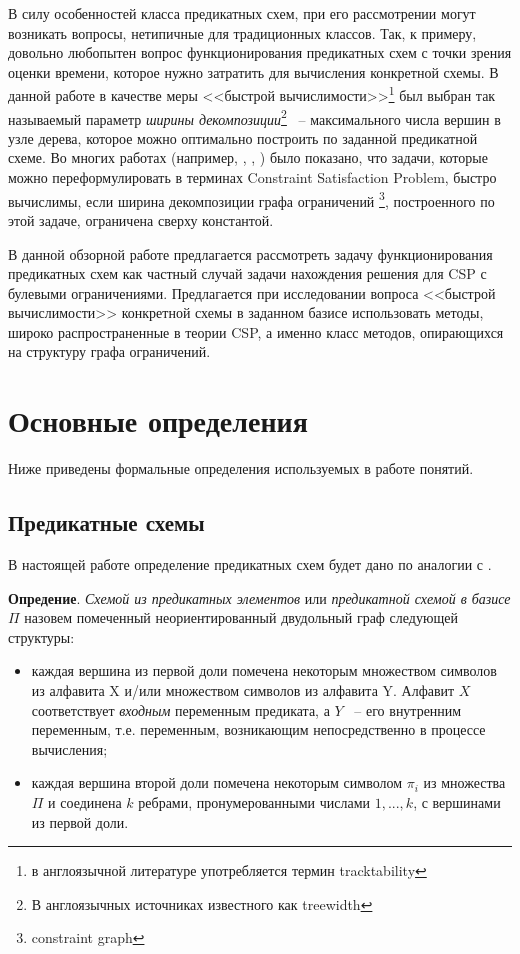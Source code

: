\documentclass[12pt]{article}
\begin{document}
В силу особенностей класса предикатных схем, при его рассмотрении могут возникать вопросы,
нетипичные для традиционных классов. Так, к примеру, довольно любопытен вопрос функционирования предикатных схем с точки зрения оценки времени, которое нужно затратить для
вычисления конкретной схемы. 
В данной работе в качестве меры <<быстрой вычислимости>>\footnote{в англоязычной литературе употребляется термин tracktability}
 был выбран так называемый параметр \textit{ширины декомпозиции}\footnote{В англоязычных источниках известного как treewidth}
 ~-- максимального числа вершин в узле дерева, 
которое можно оптимально построить по заданной предикатной схеме. 
Во многих работах (например, \cite{CSP10}, \cite{Gott10}, \cite{Prosc89}) было 
показано, что задачи, которые можно переформулировать в терминах Constraint Satisfaction Problem, 
быстро вычислимы, если ширина декомпозиции графа ограничений \footnote{constraint graph}, построенного по этой задаче,
ограничена сверху константой. 

В данной обзорной работе предлагается рассмотреть задачу функционирования предикатных схем как
частный случай задачи нахождения решения для CSP с булевыми ограничениями. Предлагается при исследовании вопроса
<<быстрой вычислимости>> конкретной схемы в заданном базисе использовать методы, широко распространенные в теории CSP,
а именно класс методов, опирающихся на структуру графа ограничений.


\section{Основные определения}
Ниже приведены формальные определения используемых в работе понятий.

\subsection{Предикатные схемы}

В настоящей работе определение предикатных схем будет дано по аналогии с \cite{Shu11}.

\textbf{Опредение}.
\textit{Схемой из предикатных элементов} или \textit{предикатной схемой в базисе $\Pi$} назовем помеченный
неориентированный двудольный граф следующей структуры:

\begin{itemize}
\item каждая вершина из первой доли помечена некоторым множеством символов из алфавита X и/или 
множеством символов из алфавита Y. 
Алфавит $X$ соответствует \textit{входным} переменным предиката, а $Y$ ~-- его внутренним переменным, 
т.е. переменным, возникающим непосредственно в процессе вычисления; 

\item каждая вершина второй доли помечена некоторым символом $\pi_i$ из множества $\Pi$ и 
соединена $k$ ребрами, пронумерованными числами $1, ..., k$, с вершинами из первой доли.
\end{itemize}
\end{document}
